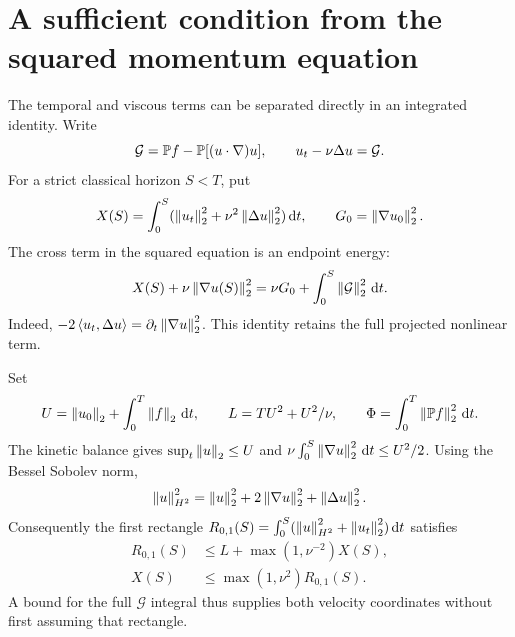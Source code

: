 
\section{A sufficient condition from the squared momentum equation}
\label{r:sec:first-rectangle}

The temporal and viscous terms can be separated directly in an integrated
identity. Write
\[
 \mathcal G=\mathbb P f-\mathbb P[(u\cdot\nabla)u],
 \qquad u_t-\nu\Delta u=\mathcal G.
\]
For a strict classical horizon \(S<T\), put
\[
 X(S)=\int_0^S(\left\lVert u_t\right\rVert_2^2+\nu^2\left\lVert \Delta u\right\rVert_2^2)\,\mathrm d t,
 \qquad G_0=\left\lVert \nabla u_0\right\rVert_2^2.
\]
The cross term in the squared equation is an endpoint energy:
\begin{equation}
 X(S)+\nu\left\lVert \nabla u(S)\right\rVert_2^2
 =\nu G_0+\int_0^S\left\lVert \mathcal G\right\rVert_2^2\,\mathrm d t.
 \label{r:eq:first-rectangle-exact}
\end{equation}
Indeed, \(-2\left\langle u_t,\Delta u\right\rangle=\partial_t\left\lVert \nabla u\right\rVert_2^2\).
This identity retains the full projected nonlinear term.

Set
\[
 U=\left\lVert u_0\right\rVert_2+\int_0^T\left\lVert f\right\rVert_2\,\mathrm d t,\qquad
 L=TU^2+U^2/\nu,\qquad
 \Phi=\int_0^T\left\lVert \mathbb P f\right\rVert_2^2\,\mathrm d t.
\]
The kinetic balance gives \(\sup_t\left\lVert u\right\rVert_2\le U\) and
\(\nu\int_0^S\left\lVert \nabla u\right\rVert_2^2\,\mathrm d t\le U^2/2\).
Using the Bessel Sobolev norm,
\[
 \left\lVert u\right\rVert_{H^2}^2=\left\lVert u\right\rVert_2^2+2\left\lVert \nabla u\right\rVert_2^2+\left\lVert \Delta u\right\rVert_2^2.
\]
Consequently the first rectangle
\(R_{0,1}(S)=\int_0^S(\left\lVert u\right\rVert_{H^2}^2+\left\lVert u_t\right\rVert_2^2)\,\mathrm d t\)
satisfies
\begin{equation}
 \begin{aligned}
 R_{0,1}(S)&\le L+\max(1,\nu^{-2})X(S),\\
 X(S)&\le\max(1,\nu^2)R_{0,1}(S).
 \end{aligned}
 \label{r:eq:first-rectangle-equivalence}
\end{equation}
A bound for the full \(\mathcal G\) integral thus supplies both
velocity coordinates without first assuming that rectangle.


